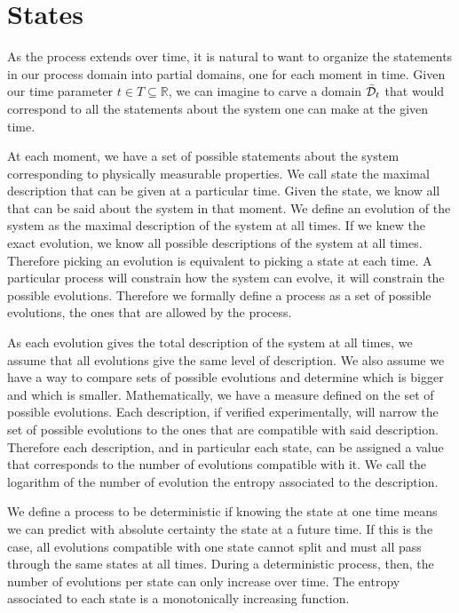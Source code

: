 \documentclass[letterpaper]{article}
\begin{document}
\section{States}

As the process extends over time, it is natural to want to organize the statements in our process domain into partial domains, one for each moment in time. Given our time parameter $t \in T \subseteq \mathbb{R}$, we can imagine to carve a domain $\bar{\mathcal{D}}_t$ that would correspond to all the statements about the system one can make at the given time.


At each moment, we have a set of possible statements about the system corresponding to physically measurable properties. We call state the maximal description that can be given at a particular time. Given the state, we know all that can be said about the system in that moment. We define an evolution of the system as the maximal description of the system at all times. If we knew the exact evolution, we know all possible descriptions of the system at all times. Therefore picking an evolution is equivalent to picking a state at each time. A particular process will constrain how the system can evolve, it will constrain the possible evolutions. Therefore we formally define a process as a set of possible evolutions, the ones that are allowed by the process.

As each evolution gives the total description of the system at all times, we assume that all evolutions give the same level of description. We also assume we have a way to compare sets of possible evolutions and determine which is bigger and which is smaller. Mathematically, we have a measure defined on the set of possible evolutions. Each description, if verified experimentally, will narrow the set of possible evolutions to the ones that are compatible with said description. Therefore each description, and in particular each state, can be assigned a value that corresponds to the number of evolutions compatible with it. We call the logarithm of the number of evolution the entropy associated to the description.

We define a process to be deterministic if knowing the state at one time means we can predict with absolute certainty the state at a future time. If this is the case, all evolutions compatible with one state cannot split and must all pass through the same states at all times. During a deterministic process, then, the number of evolutions per state can only increase over time. The entropy associated to each state is a monotonically increasing function.
\end{document}
